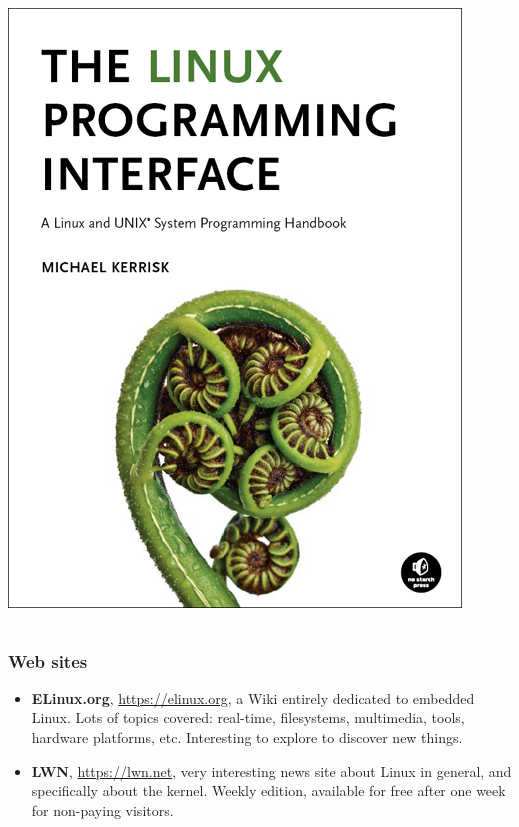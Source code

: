 \begin{frame}
\begin{columns}
    \vspace{0.5cm}
    \includegraphics[height=0.25\textheight]{common/linux-programming-interface.png}\\
  \end{columns}
\end{frame}

\begin{frame}
  \frametitle{Web sites}
  \begin{itemize}
  \item {\bf ELinux.org}, \url{https://elinux.org}, a Wiki entirely
    dedicated to embedded Linux. Lots of topics covered: real-time,
    filesystems, multimedia, tools, hardware platforms,
    etc. Interesting to explore to discover new things.
  \item {\bf LWN}, \url{https://lwn.net}, very interesting news site
    about Linux in general, and specifically about the kernel. Weekly
    edition, available for free after one week for non-paying
    visitors.
  \end{itemize}
\end{frame}

